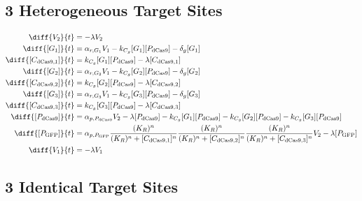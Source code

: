 \subsection{3 Heterogeneous Target Sites}
\label{s:Multiplexed_3_gRNA_Repression}

\begin{align}
\diff{\constructGen{2}}{t} & = - \dilutionRate{}\constructGen{2}\\
\diff{\conc{\gRna{1}}}{t} & =  \txRate{\gRna{1}}\constructGen{1} - \gRnaBind{}\conc{\gRna{1}}\conc{\proSp{\cas{}}} - \rnaDegradeRate{}\conc{\gRna{1}}\\
\diff{\conc{\cplx{\cas}{1}}}{t} & =  \gRnaBind{}\conc{\gRna{1}}\conc{\proSp{\cas{}}} - \dilutionRate{}\conc{\cplx{\cas}{1}}\\
\diff{\conc{\gRna{2}}}{t} & =  \txRate{\gRna{2}}\constructGen{1} - \gRnaBind{}\conc{\gRna{2}}\conc{\proSp{\cas{}}} - \rnaDegradeRate{}\conc{\gRna{2}}\\
\diff{\conc{\cplx{\cas}{2}}}{t} & =  \gRnaBind{}\conc{\gRna{2}}\conc{\proSp{\cas{}}} - \dilutionRate{}\conc{\cplx{\cas}{2}}\\
\diff{\conc{\gRna{3}}}{t} & =  \txRate{\gRna{3}}\constructGen{1} - \gRnaBind{}\conc{\gRna{3}}\conc{\proSp{\cas{}}} - \rnaDegradeRate{}\conc{\gRna{3}}\\
\diff{\conc{\cplx{\cas}{3}}}{t} & =  \gRnaBind{}\conc{\gRna{3}}\conc{\proSp{\cas{}}} - \dilutionRate{}\conc{\cplx{\cas}{3}}\\
\diff{\conc{\proSp{\cas{}}}}{t} & =  \txtlRate{\proSp{\cas{}}}\constructGen{2} - \dilutionRate{}\conc{\proSp{\cas{}}} - \gRnaBind{}\conc{\gRna{1}}\conc{\proSp{\cas{}}} - \gRnaBind{}\conc{\gRna{2}}\conc{\proSp{\cas{}}} - \gRnaBind{}\conc{\gRna{3}}\conc{\proSp{\cas{}}}\\
\diff{\conc{\proSp{\gfp}}}{t} & =  \txtlRate{\proSp{\gfp}}\frac{(K_R)^n}{(K_R)^n + \conc{\cplx{\cas}{1}}^n}\frac{(K_R)^n}{(K_R)^n + \conc{\cplx{\cas}{2}}^n}\frac{(K_R)^n}{(K_R)^n + \conc{\cplx{\cas}{3}}^n}\constructGen{2} - \dilutionRate{}\conc{\proSp{\gfp}}\\
\diff{\constructGen{1}}{t} & = - \dilutionRate{}\constructGen{1}
\end{align}

\subsection{3 Identical Target Sites}
\label{s:Multisite_3_gRNA_Repression}

